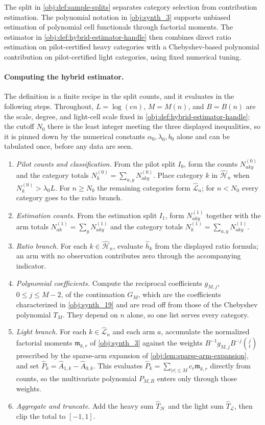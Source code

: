 The split in \cref{obj:def:sample-splits} separates category selection from contribution estimation. The polynomial notation in \cref{obj:synth_3} supports unbiased estimation of polynomial cell functionals through factorial moments. The estimator in \cref{obj:def:hybrid-estimator-handle} then combines direct ratio estimation on pilot-certified heavy categories with a Chebyshev-based polynomial contribution on pilot-certified light categories, using fixed numerical tuning.

\paragraph{Computing the hybrid estimator.}
The definition is a finite recipe in the split counts, and it evaluates in the following steps. Throughout, \(L=\log(en)\), \(M=M(n)\), and \(B=B(n)\) are the scale, degree, and light-cell scale fixed in \cref{obj:def:hybrid-estimator-handle}; the cutoff \(N_0\) there is the least integer meeting the three displayed inequalities, so it is pinned down by the numerical constants \(\alpha_0,\lambda_0,b_0\) alone and can be tabulated once, before any data are seen.
\begin{enumerate}
\item \emph{Pilot counts and classification.} From the pilot split \(I_0\), form the counts \(N^{(0)}_{aky}\) and the category totals \(N^{(0)}_k=\sum_{a,y}N^{(0)}_{aky}\). Place category \(k\) in \(\widehat{\mathcal H}_n\) when \(N^{(0)}_k>\lambda_0L\). For \(n\ge N_0\) the remaining categories form \(\widehat{\mathcal L}_n\); for \(n<N_0\) every category goes to the ratio branch.
\item \emph{Estimation counts.} From the estimation split \(I_1\), form \(N^{(1)}_{aky}\) together with the arm totals \(N^{(1)}_{ak}=\sum_yN^{(1)}_{aky}\) and the category totals \(N^{(1)}_k=\sum_{a,y}N^{(1)}_{aky}\).
\item \emph{Ratio branch.} For each \(k\in\widehat{\mathcal H}_n\), evaluate \(\widehat h_k\) from the displayed ratio formula; an arm with no observation contributes zero through the accompanying indicator.
\item \emph{Polynomial coefficients.} Compute the reciprocal coefficients \(g_{M,j}\), \(0\le j\le M-2\), of the continuation \(G_M\), which are the coefficients characterized in \cref{obj:synth_19} and are read off from those of the Chebyshev polynomial \(T_M\). They depend on \(n\) alone, so one list serves every category.
\item \emph{Light branch.} For each \(k\in\widehat{\mathcal L}_n\) and each arm \(a\), accumulate the normalized factorial moments \(\mathfrak m_{k,r}\) of \cref{obj:synth_3} against the weights \(B^{-1}g_{M,j}B^{-j}\binom jt\) prescribed by the sparse-arm expansion of \cref{obj:lem:sparse-arm-expansion}, and set \(\widehat P_k=\widehat A_{1,k}-\widehat A_{0,k}\). This evaluates \(\widehat P_k=\sum_{|r|\le M}c_r\mathfrak m_{k,r}\) directly from counts, so the multivariate polynomial \(P_{M,B}\) enters only through those weights.
\item \emph{Aggregate and truncate.} Add the heavy sum \(\widehat T_{\mathcal H}\) and the light sum \(\widehat T_{\mathcal L}\), then clip the total to \([-1,1]\).
\end{enumerate}
